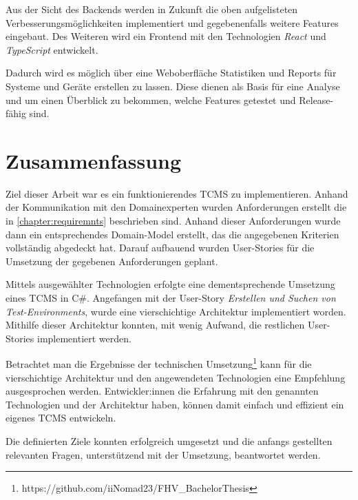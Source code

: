 \documentclass[a4paper, fontsize=11pt, parskip=half, twoside, headings=openright]{scrreprt}
\begin{document}
	Aus der Sicht des Backends werden in Zukunft die oben aufgelisteten Verbesserungsmöglichkeiten implementiert und gegebenenfalls weitere Features eingebaut.
	Des Weiteren wird ein Frontend mit den Technologien \emph{React} und \emph{TypeScript} entwickelt.
	
	Dadurch wird es möglich über eine Weboberfläche Statistiken und Reports für Systeme und Geräte erstellen zu lassen. Diese dienen als Basis für eine Analyse und um einen Überblick zu bekommen, welche Features getestet und Release-fähig sind.
	
	\chapter{Zusammenfassung}
	Ziel dieser Arbeit war es ein funktionierendes \ac{TCMS} zu implementieren. 
	Anhand der Kommunikation mit den Domainexperten wurden Anforderungen erstellt die in \autoref{chapter:requiremnts} beschrieben sind.
	Anhand dieser Anforderungen wurde dann ein entsprechendes Domain-Model erstellt, das die angegebenen Kriterien vollständig abgedeckt hat.
	Darauf aufbauend wurden User-Stories für die Umsetzung der gegebenen Anforderungen geplant.	
	
	Mittels ausgewählter Technologien erfolgte eine dementsprechende Umsetzung eines \ac{TCMS} in C\#.
	Angefangen mit der User-Story \emph{Erstellen und Suchen von Test-Environments}, wurde eine vierschichtige Architektur implementiert worden.
	Mithilfe dieser Architektur konnten, mit wenig Aufwand, die restlichen User-Stories implementiert werden.
	
	Betrachtet man die Ergebnisse der technischen Umsetzung\footnote{https://github.com/iiNomad23/FHV\_BachelorThesis} kann für die vierschichtige Architektur und den angewendeten Technologien eine Empfehlung ausgesprochen werden. 
	Entwickler:innen die Erfahrung mit den genannten Technologien und der Architektur haben, können damit einfach und effizient ein eigenes \ac{TCMS} entwickeln.
	
	Die definierten Ziele konnten erfolgreich umgesetzt und die anfangs gestellten relevanten Fragen, unterstützend mit der Umsetzung, beantwortet werden.
	
	
	\clearpage
	\printbibliography
	
\end{document}
